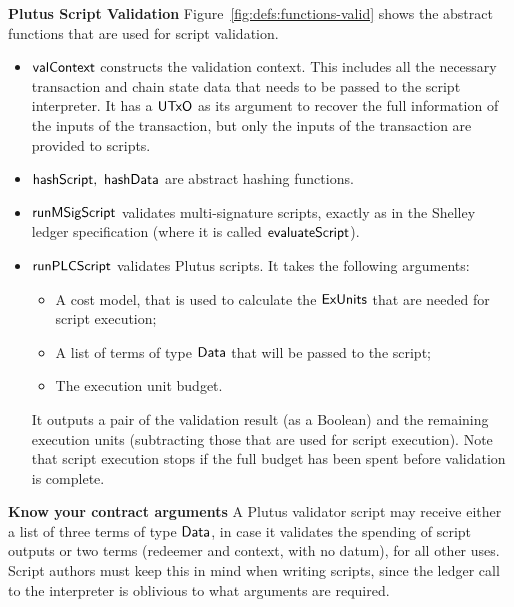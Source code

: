 \textbf{Plutus Script Validation}
Figure~\ref{fig:defs:functions-valid} shows the abstract functions that are used for script validation.

\begin{itemize}
\item
  $\mathsf{valContext}$ constructs the validation context.
  This includes all the necessary transaction and chain state data that needs to be passed to the script interpreter.
    It has a $\mathsf{UTxO}$ as its argument to recover the full information of the inputs of the transaction,
    but only the inputs of the transaction are provided to scripts.
\item
    $\mathsf{hashScript},~ \mathsf{hashData}$ are abstract hashing functions.
\item
  $\mathsf{runMSigScript}$ validates multi-signature scripts, exactly as in the Shelley ledger specification (where it is called $\mathsf{evaluateScript}$).
\item
  $\mathsf{runPLCScript}$ validates Plutus scripts. It takes the following
  arguments:
  \begin{itemize}
  \item A cost model, that is used to calculate the $\mathsf{ExUnits}$ that are needed for script execution;
  \item A list of terms of type $\mathsf{Data}$ that will be passed to the script; %
  \item The execution unit budget.
  \end{itemize}
  It outputs a pair of the validation result (as a Boolean)
  and the remaining execution units (subtracting those that are used for script execution).
  Note that script execution stops if the full budget has been spent before validation is complete.
\end{itemize}

\begin{note}
  \textbf{Know your contract arguments}
  A Plutus validator script may receive either a list of three terms of type $\mathsf{Data}$, in case it validates the spending of script outputs
  or two terms (redeemer and context, with no datum), for all other uses.
  Script authors must keep this in mind when writing scripts, since the ledger call to the interpreter is oblivious to what
  arguments are required.
\end{note}


